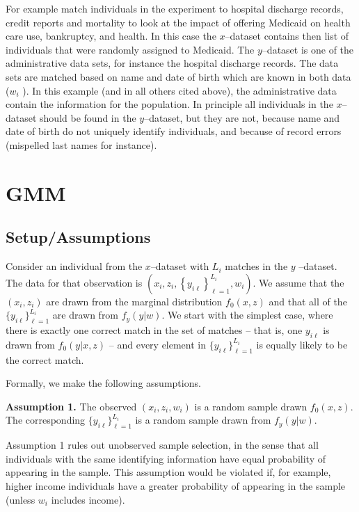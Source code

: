 \documentclass[12pt]{article}
\renewcommand{\cite}{\citeasnoun}
\newcommand{\yiL}{\{y_{i\ell}\}_{\ell=1}^{L_i}}
\begin{document}
For example \cite{Finkelstein2012} match individuals in the experiment to
hospital discharge records, credit reports and mortality to look at the
impact of offering Medicaid on health care use, bankruptcy, and health. In
this case the $x$--dataset contains then list of individuals that were
randomly assigned to Medicaid. The $y$--dataset is one of the administrative
data sets, for instance the hospital discharge records. The data sets are
matched based on name and date of birth which are known in both data ($w_{i}$%
). In this example (and in all others cited above), the administrative data
contain the information for the population. In principle all individuals in
the $x$--dataset should be found in the $y$--dataset, but they are not,
because name and date of birth do not uniquely identify individuals, and
because of record errors (mispelled last names for instance).

\section{GMM}
\subsection{Setup/Assumptions}

Consider an individual from the $x$--dataset with $L_{i}$ matches in the $y$%
--dataset. The data for that observation is $\left( x_{i},z_{i},\left\{
y_{i\ell}\right\} _{\ell =1}^{L_{i}},w_{i}\right) $.   We assume that the $(x_i, z_i)$ are drawn from the marginal distribution $f_0(x,z)$ and that all of the $\{y_{i\ell}\}_{\ell=1}^{L_i}$ are drawn from $f_y(y | w)$.  We start with the simplest case, where there is exactly one correct match in the set of matches -- that is, one $y_{i\ell}$ is drawn from $f_0(y | x, z)$ -- and
 every element in $\yiL$ is equally likely to be the correct match. 

Formally, we make the following assumptions.

\textbf{Assumption 1.} The observed $(x_i, z_i, w_i)$ is a random sample drawn 
$f_0(x,z)$.   The corresponding $\{y_{i\ell}\}_{\ell=1}^{L_i}$ is a random sample drawn from $f_y (y | w)$.

Assumption 1 rules out unobserved sample selection, in the sense that all individuals with the same identifying information have equal probability of appearing in the sample.  This assumption would be violated if, for example, higher income individuals have a greater probability of appearing in the sample (unless $w_i$ includes income).   
\end{document}
